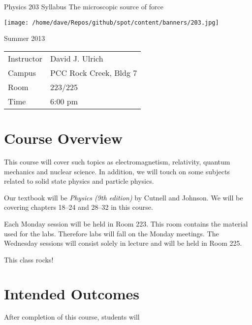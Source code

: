 \documentclass{article}
\begin{document}
\begin{center}
{\LARGE Physics 203 Syllabus}
\vskip 0.25cm
{\large The microscopic source of force}

\vskip 0.25cm
\texttt{[image: /home/dave/Repos/github/spot/content/banners/203.jpg]}

\vskip 0.25cm
{\large Summer 2013}
\end{center}

\begin{center}
\renewcommand{\arraystretch}{1.5}
\renewcommand{\tabcolsep}{0.2cm}
\begin{tabular}{ll}
\hline
Instructor & David J. Ulrich \\




Campus & PCC Rock Creek, Bldg 7 \\ 
Room & 223/225 \\ 
Time & 6:00 pm \\ 
\hline
\end{tabular}
\end{center}

\section{Course Overview}

%
This course will cover such topics as electromagnetism, relativity, quantum mechanics and nuclear science.
%
In addition, we will touch on some subjects related to solid state physics and particle physics.
%
%

%
Our textbook will be \emph{Physics (9th edition)} by Cutnell and Johnson.
%
We will be covering chapters 18--24 and 28--32 in this course.
%
%

Each Monday session will be held in Room 223. This room contains the material used for the labs. Therefore labs will fall on the Monday meetings. The Wednesday sessions will consist solely in lecture and will be held in Room 225.

This class rocks!



\section{Intended Outcomes}

After completion of this course, students will
\end{document}
